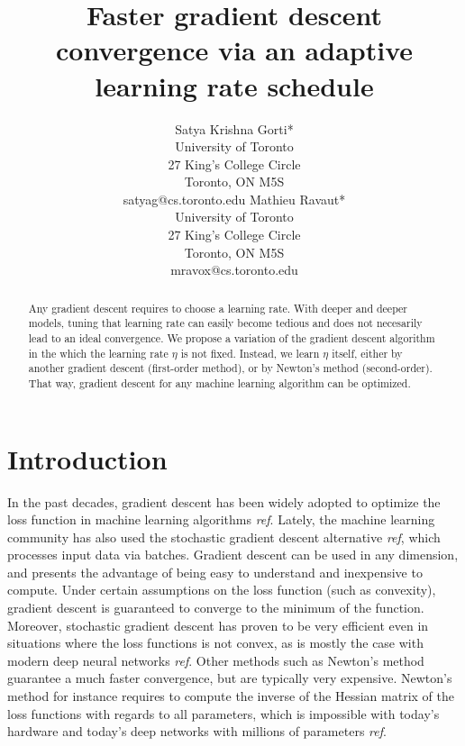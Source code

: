 \documentclass{article}
\title{Faster gradient descent convergence via an adaptive learning rate schedule}
\author{
  	Satya Krishna Gorti*\\
  	University of Toronto\\
  	27 King's College Circle\\
  	Toronto, ON M5S\\
  	satyag@cs.toronto.edu
  	\And
	Mathieu Ravaut* \\ 
	University of Toronto \\
	27 King's College Circle\\
	Toronto, ON M5S\\
	mravox@cs.toronto.edu \\
}
\begin{document}
  
  \printlength\textwidth
  
  \maketitle
  
  \begin{abstract}
    Any gradient descent requires to choose a learning rate. With deeper and deeper models, tuning that learning rate can easily become tedious and does not necesarily lead to an ideal convergence. We propose a variation of the gradient descent algorithm in the which the learning rate $\eta$ is not fixed. Instead, we learn $\eta$ itself, either by another gradient descent (first-order method), or by Newton's method (second-order). That way, gradient descent for any machine learning algorithm can be optimized. 
  \end{abstract}
  
  \thispagestyle{equalc}
  \section{Introduction}
  
  In the past decades, gradient descent has been widely adopted to optimize the loss function in machine learning algorithms \emph{ref}. Lately, the machine learning community has also used the stochastic gradient descent alternative \emph{ref}, which processes input data via batches. Gradient descent can be used in any dimension, and presents the advantage of being easy to understand and inexpensive to compute. Under certain assumptions on the loss function (such as convexity), gradient descent is guaranteed to converge to the minimum of the function. Moreover, stochastic gradient descent has proven to be very efficient even in situations where the loss functions is not convex, as is mostly the case with modern deep neural networks \emph{ref}. Other methods such as Newton's method guarantee a much faster convergence, but are typically very expensive. Newton's method for instance requires to compute the inverse of the Hessian matrix of the loss functions with regards to all parameters, which is impossible with today's hardware and today's deep networks with millions of parameters \emph{ref}. \\
  
\end{document}
